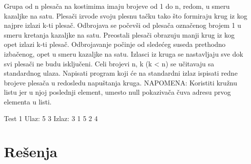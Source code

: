 \begin{Exercise}[label=611]
Grupa od n plesača na kostimima imaju brojeve od 1 do n, redom, u smeru kazaljke na satu.
Plesači izvode svoju plesnu tačku tako što formiraju krug iz kog najpre izlazi k-ti plesač.
Odbrojava se počevši od plesača označenog brojem 1 u smeru kretanja kazaljke na satu. 
Preostali plesači obrazuju manji krug iz kog opet izlazi k-ti plesač. Odbrojavanje počinje od
sledećeg suseda prethodno izbačenog, opet u smeru kazaljke na satu. Izlasci iz kruga se nastavljaju
sve dok svi plesači ne budu isključeni. 
Celi brojevi n, k (k < n) se učitavaju sa standardnog ulaza. Napisati program koji će na standardni 
izlaz ispisati redne brojeve plesača u redosledu napuštanja kruga. 
NAPOMENA: Koristiti kružnu listu jer u njoj poslednji element, umesto null 
pokazivača čuva adresu prvog elementa u listi.
\begin{maxitest}
  \begin{test}{Test 1}
Ulaz: 5 3 
Izlaz: 3 1 5 2 4
  \end{test}
\end{maxitest}

\end{Exercise}
\begin{Answer}[ref=611]
\end{Answer}



\section{Rešenja}
\shipoutAnswer


